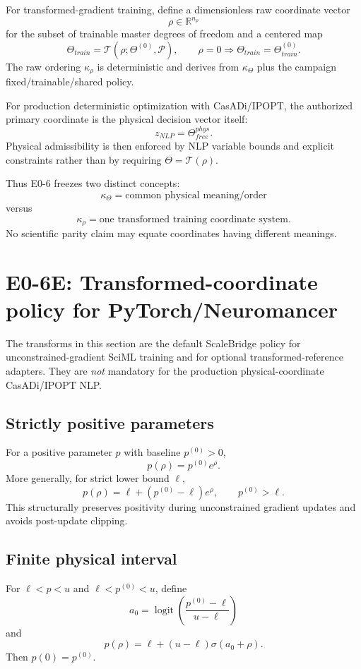 \documentclass[11pt]{article}
\newcommand{\logit}{\operatorname{logit}}
\newcommand{\sigmoid}{\sigma}
\begin{document}
For transformed-gradient training, define a dimensionless raw coordinate vector
\[
\boxed{\rho\in\mathbb R^{n_\rho}}
\]
for the subset of trainable master degrees of freedom and a centered map
\[
\boxed{\Theta_{train}=\mathcal T(\rho;\Theta^{(0)},\mathcal P)},
\qquad
\boxed{\rho=0\Longrightarrow\Theta_{train}=\Theta_{train}^{(0)}}.
\]
The raw ordering $\kappa_\rho$ is deterministic and derives from
$\kappa_\Theta$ plus the campaign fixed/trainable/shared policy.

For production deterministic optimization with CasADi/IPOPT, the authorized
primary coordinate is the physical decision vector itself:
\[
\boxed{z_{NLP}=\Theta_{free}^{phys}.}
\]
Physical admissibility is then enforced by NLP variable bounds and explicit
constraints rather than by requiring $\Theta=\mathcal T(\rho)$.

Thus E0-6 freezes two distinct concepts:
\[
\boxed{\kappa_\Theta=\text{common physical meaning/order}}
\]
versus
\[
\boxed{\kappa_\rho=\text{one transformed training coordinate system}.}
\]
No scientific parity claim may equate coordinates having different meanings.

\section{E0-6E: Transformed-coordinate policy for PyTorch/Neuromancer}

The transforms in this section are the default ScaleBridge policy for
unconstrained-gradient SciML training and for optional transformed-reference
adapters. They are \emph{not} mandatory for the production physical-coordinate
CasADi/IPOPT NLP.

\subsection{Strictly positive parameters}
For a positive parameter $p$ with baseline $p^{(0)}>0$,
\[
\boxed{p(\rho)=p^{(0)}e^{\rho}.}
\]
More generally, for strict lower bound $\ell$,
\[
\boxed{p(\rho)=\ell+(p^{(0)}-\ell)e^{\rho},\qquad p^{(0)}>\ell.}
\]
This structurally preserves positivity during unconstrained gradient updates and
avoids post-update clipping.

\subsection{Finite physical interval}
For $\ell<p<u$ and $\ell<p^{(0)}<u$, define
\[
a_0=\logit\left(\frac{p^{(0)}-\ell}{u-\ell}\right)
\]
and
\[
\boxed{p(\rho)=\ell+(u-\ell)\sigmoid(a_0+\rho).}
\]
Then $p(0)=p^{(0)}$.
\end{document}
